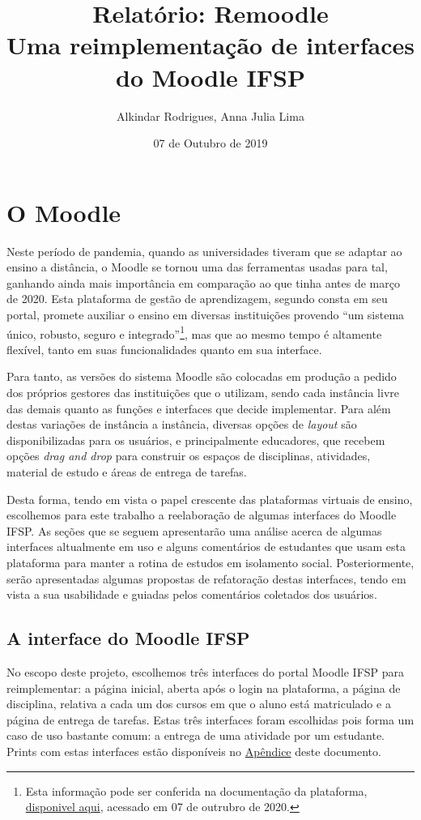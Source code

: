 \documentclass[11pt]{article}
\author{Alkindar Rodrigues, Anna Julia Lima}
\date{07 de Outubro de 2019}
\title{Relatório: Remoodle\\\medskip
\large Uma reimplementação de interfaces do Moodle IFSP}
\begin{document}
\maketitle

\section*{O Moodle}
\label{sec:org5819814}
Neste período de pandemia, quando as universidades tiveram que se
adaptar ao ensino a distância, o Moodle se tornou uma das ferramentas
usadas para tal, ganhando ainda mais importância em comparação ao que
tinha antes de março de 2020.
Esta plataforma de gestão de aprendizagem, segundo consta em seu
portal, promete auxiliar o ensino em diversas instituições provendo
``um sistema único, robusto, seguro e integrado''\footnote{Esta informação pode ser conferida na documentação da
plataforma, \href{https://docs.moodle.org/39/en/About\_Moodle\#Highly\_flexible\_and\_fully\_customisable}{disponivel aqui}, acessado em 07 de outrubro de 2020.}, mas que ao mesmo
tempo é altamente flexível, tanto em suas funcionalidades quanto em
sua interface.

Para tanto, as versões do sistema Moodle são colocadas em produção
a pedido dos próprios gestores das instituições que o utilizam, sendo
cada instância livre das demais quanto as funções e interfaces
que decide implementar.
Para além destas variações de instância a instância, diversas opções
de \emph{layout} são disponibilizadas para os usuários, e principalmente
educadores, que recebem opções \emph{drag and drop} para construir os
espaços de disciplinas, atividades, material de estudo e áreas de
entrega de tarefas.

Desta forma, tendo em vista o papel crescente das plataformas virtuais
de ensino, escolhemos para este trabalho a reelaboração de algumas
interfaces do Moodle IFSP.
As seções que se seguem apresentarão uma análise acerca de algumas
interfaces altualmente em uso e alguns comentários de estudantes que
usam esta plataforma para manter a rotina de estudos em isolamento
social.
Posteriormente, serão apresentadas algumas propostas de refatoração
destas interfaces, tendo em vista a sua usabilidade e guiadas pelos
comentários coletados dos usuários.

\subsection*{A interface do Moodle IFSP}
\label{sec:orgeba2245}
No escopo deste projeto, escolhemos três interfaces do portal Moodle
IFSP para reimplementar: a página inicial, aberta após o login na
plataforma, a página de disciplina, relativa a cada um dos cursos em
que o aluno está matriculado e a página de entrega de tarefas.  Estas
três interfaces foram escolhidas pois forma um caso de uso bastante
comum: a entrega de uma atividade por um estudante. Prints com estas
interfaces estão disponíveis no \hyperref[sec:org206f0e1]{Apêndice} deste documento.
\end{document}
